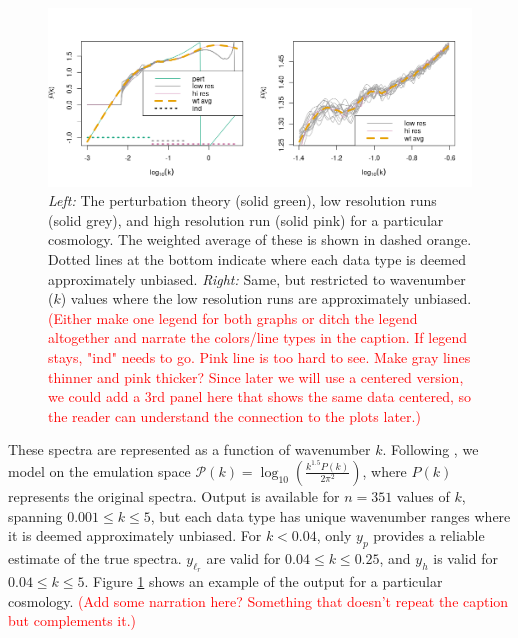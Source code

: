 \documentclass[11pt]{article}
\begin{document}
\begin{figure}[ht]
    \centering
    \includegraphics[width=\linewidth, trim=0 13 0 45, clip=TRUE]{plot_data.png}
    \caption{{\it Left:} The perturbation theory (solid green), low resolution runs (solid grey), 
    and high resolution run  (solid pink) for a particular cosmology. 
    The weighted average of these is shown in dashed orange. Dotted lines at the bottom 
    indicate where each data type is deemed approximately unbiased. 
    {\it Right:} Same, but restricted to wavenumber ($k$) values where the low resolution 
    runs are approximately unbiased.
    \textcolor{red}{(Either make one legend for both graphs or ditch the legend 
    altogether and narrate the colors/line types in the caption.  If legend stays, "ind" needs
    to go.  Pink line is too hard to see.  Make gray lines thinner and pink thicker?
    Since later we will use a centered version, we could add a 3rd panel here that shows the
    same data centered, so the reader can understand the connection to the plots later.)}}
    \label{fig:plot_data}
\end{figure}

These spectra are represented as a function of wavenumber $k$.  Following 
\cite{moran2023mira}, we model on the emulation space 
$\mathcal{P}(k)=\log_{10}\left(\frac{k^{1.5}P(k)}{2\pi^2}\right)$, where $P(k)$ represents the
original spectra. Output is available for $n=351$ values of $k$, spanning
$0.001 \leq k \leq 5$, but each data type has unique wavenumber ranges
where it is deemed approximately unbiased. For $k<0.04$, only $y_p$ provides a reliable 
estimate of the true spectra. $y_{\ell_r}$ are valid for $0.04 \leq k \leq 0.25$, and 
$y_h$ is valid for $0.04 \leq k \leq 5$.  Figure \ref{fig:plot_data} shows an example 
of the output for a particular cosmology. \textcolor{red}{(Add some narration here?  Something
that doesn't repeat the caption but complements it.)}
\end{document}
